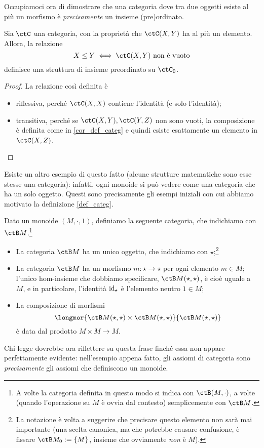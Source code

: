 Occupiamoci ora di dimostrare che una categoria dove tra due oggetti esiste al più un morfismo è \emph{precisamente} un insieme (pre)ordinato.
\begin{theorem}\label{cat_sonopos}
	Sia \(\ctC\) una categoria, con la proprietà che \(\ctC(X,Y)\) ha al più un elemento. Allora, la relazione
	\[X\le Y \iff \ctC(X,Y) \text{ non è vuoto}\]
	definisce una struttura di insieme preordinato su \(\ctC_0\).
\end{theorem}
\begin{proof}
	La relazione così definita è
	\begin{itemize}
		\item riflessiva, perché \(\ctC(X,X)\) contiene l'identità (e solo l'identità);
		\item transitiva, perché se \(\ctC(X,Y), \ctC(Y,Z)\) non sono vuoti, la composizione è definita come in \ref{cor_def_categ} e quindi esiste esattamente un elemento in \(\ctC(X,Z)\).
	\end{itemize}
\end{proof}
Esiste un altro esempio di questo fatto (alcune strutture matematiche sono esse stesse una categoria): infatti, ogni monoide si può vedere come una categoria che ha un solo oggetto. Questi sono precisamente gli esempi iniziali con cui abbiamo motivato la definizione \ref{def_categ}.
\begin{theorem}\label{mon_sonocat}
	Dato un monoide \((M,\cdot,1)\), definiamo la seguente categoria, che indichiamo con \(\ctB M\).\footnote{A volte la categoria definita in questo modo si indica con \(\ctB(M,\cdot)\), a volte (quando l'operazione su \(M\) è ovvia dal contesto) semplicemente con \(\ctB M\).}
	\begin{itemize}
		\item La categoria \(\ctB M\) ha un unico oggetto, che indichiamo con \(\star\);\footnote{La notazione è volta a suggerire che precisare questo elemento non sarà mai importante (una scelta canonica, ma che potrebbe causare confusione, è fissare \(\ctB M_0 := \{M\}\), insieme che ovviamente \emph{non} è \(M\)).}
		\item La categoria \(\ctB M\) ha un morfismo \(m:\star\to\star\) per ogni elemento \(m\in M\); l'unico hom-insieme che dobbiamo specificare, \(\Hom{\ctB M}(\star,\star)\), è cioè uguale a \(M\), e in particolare, l'identità \(\mathrm{id}_\star\) è l'elemento neutro \(1\in M\);
		\item La composizione di morfismi
		      \[\longmor{\Hom{\ctB M}(\star,\star)\times \Hom{\ctB M}(\star,\star)}{\Hom{\ctB M}(\star,\star)}\]
		      è data dal prodotto \(M\times M\to M\).
	\end{itemize}
\end{theorem}
Chi legge dovrebbe ora riflettere su questa frase finché essa non appare perfettamente evidente: nell'esempio appena fatto, gli assiomi di categoria sono \emph{precisamente} gli assiomi che definiscono un monoide.

